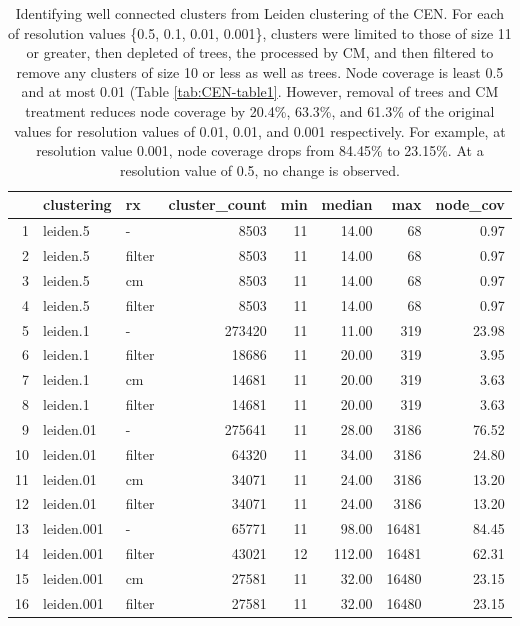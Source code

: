 \documentclass[11pt]{article}   	%
\begin{document}
\begin{table}[H]
\centering
\begin{tabular}{rllrrrrr}
  \hline
 & clustering & rx & cluster\_count & min & median & max & node\_cov \\
  \hline
1 & leiden.5 & -  & 8503 &  11 & 14.00 &  68 & 0.97 \\
  2 & leiden.5 & filter & 8503 &  11 & 14.00 &  68 & 0.97 \\
  3 & leiden.5 & cm & 8503 &  11 & 14.00 &  68 & 0.97 \\
  4 & leiden.5 & filter & 8503 &  11 & 14.00 &  68 & 0.97 \\
  5 & leiden.1 & - & 273420 &  11 & 11.00 & 319 & 23.98 \\
  6 & leiden.1 & filter & 18686 &  11 & 20.00 & 319 & 3.95 \\
  7 & leiden.1 & cm & 14681 &  11 & 20.00 & 319 & 3.63 \\
  8 & leiden.1 & filter & 14681 &  11 & 20.00 & 319 & 3.63 \\
  9 & leiden.01 & -& 275641 &  11 & 28.00 & 3186 & 76.52 \\
  10 & leiden.01 & filter & 64320 &  11 & 34.00 & 3186 & 24.80 \\
  11 & leiden.01 & cm & 34071 &  11 & 24.00 & 3186 & 13.20 \\
  12 & leiden.01 & filter & 34071 &  11 & 24.00 & 3186 & 13.20 \\
  13 & leiden.001 & - & 65771 &  11 & 98.00 & 16481 & 84.45 \\
  14 & leiden.001 & filter & 43021 &  12 & 112.00 & 16481 & 62.31 \\
  15 & leiden.001 & cm & 27581 &  11 & 32.00 & 16480 & 23.15 \\
  16 & leiden.001 & filter & 27581 &  11 & 32.00 & 16480 & 23.15 \\
   \hline
\end{tabular}
\caption{Identifying well connected clusters from Leiden clustering of the CEN. For each of resolution values \{0.5, 0.1, 0.01, 0.001\}, clusters were limited to those of size 11 or greater, then depleted of trees, the processed by CM, and then filtered to remove any clusters of size 10 or less as well as trees. Node coverage is least 0.5 and at most  0.01 (Table \ref{tab:CEN-table1}. However, removal of trees and CM treatment reduces node coverage by 20.4\%, 63.3\%, and 61.3\% of the original values for resolution values of 0.01, 0.01, and 0.001 respectively.  For example, at resolution value 0.001, node coverage drops from 84.45\% to 23.15\%. At a resolution value of 0.5, no change is observed.}
\label{tab:CEN-table2}
\end{table}
\end{document}
